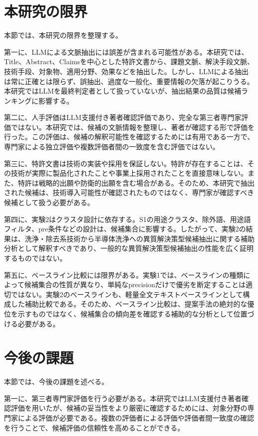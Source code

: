 \section{本研究の限界}

本節では、本研究の限界を整理する。

第一に、LLMによる文脈抽出には誤差が含まれる可能性がある。本研究では、Title、Abstract、Claimsを中心とした特許文書から、課題文脈、解決手段文脈、技術手段、対象物、適用分野、効果などを抽出した。しかし、LLMによる抽出は常に正確とは限らず、誤抽出、過度な一般化、重要情報の欠落が起こりうる。本研究ではLLMを最終判定者として扱っていないが、抽出結果の品質は候補ランキングに影響する。

第二に、人手評価はLLM支援付き著者確認評価であり、完全な第三者専門家評価ではない。本研究では、候補の文脈情報を整理し、著者が確認する形で評価を行った。この評価は、候補の解釈可能性を確認するためには有用である一方で、専門家による独立評価や複数評価者間の一致度を含む評価ではない。

第三に、特許文書は技術の実装や採用を保証しない。特許が存在することは、その技術が実際に製品化されたことや事業上採用されたことを直接意味しない。また、特許は戦略的出願や防衛的出願を含む場合がある。そのため、本研究で抽出された候補は、技術導入可能性が確認されたものではなく、専門家が確認すべき候補として扱う必要がある。

第四に、実験2はクラスタ設計に依存する。S1の用途クラスタ、除外語、用途語フィルタ、pre条件などの設計は、候補集合に影響する。したがって、実験2の結果は、洗浄・除去系技術から半導体洗浄への異質解決策型候補抽出に関する補助分析として解釈すべきであり、一般的な異質解決策型候補抽出の性能を広く証明するものではない。

第五に、ベースライン比較には限界がある。実験1では、ベースラインの種類によって候補集合の性質が異なり、単純なprecisionだけで優劣を断定することは適切ではない。実験2のベースラインも、軽量全文テキストベースラインとして構成した補助比較である。そのため、ベースライン比較は、提案手法の絶対的な優位を示すものではなく、候補集合の傾向差を確認する補助的な分析として位置づける必要がある。

\section{今後の課題}

本節では、今後の課題を述べる。

第一に、第三者専門家評価を行う必要がある。本研究ではLLM支援付き著者確認評価を用いたが、候補の妥当性をより厳密に確認するためには、対象分野の専門家による評価が必要である。複数の評価者による評価や評価者間一致度の確認を行うことで、候補評価の信頼性を高めることができる。

